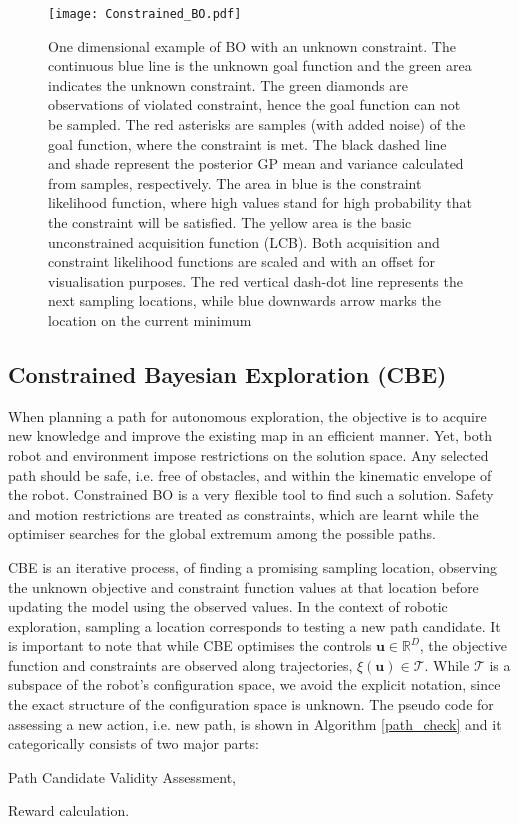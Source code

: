 \documentclass[shortAfour,sageh,times]{sagej_no_sage}
\begin{document}
\begin{figure}[bt]
	
	\centering
	
	\texttt{[image: Constrained\_BO.pdf]}
	
	\caption{One dimensional example of BO with an unknown constraint. The continuous blue line is the unknown goal function and the green area indicates the unknown constraint. The green diamonds are observations of violated constraint, hence the goal function can not be sampled. The red asterisks are samples (with added noise) of the goal function, where the constraint is met. The black dashed line and shade represent the posterior GP mean and variance calculated from samples, respectively. The area in blue is the constraint likelihood function, where high values stand for high probability that the constraint will be satisfied. The yellow area is the basic unconstrained acquisition function (LCB). Both acquisition and constraint likelihood functions are scaled and with an offset for visualisation purposes. The red vertical dash-dot line represents the next sampling locations, while blue downwards arrow marks the location on the current minimum}
	\label{constrained_bo_fig}
\end{figure}
\subsection{Constrained Bayesian Exploration (CBE)}\label{CBO_exploration}
When planning a path for autonomous exploration, the objective is to acquire new knowledge and improve the existing map in an efficient manner. Yet, both robot and environment impose restrictions on the solution space. Any selected path should be safe, i.e. free of obstacles, and within the kinematic envelope of the robot. Constrained BO is a very flexible tool to find such a solution. Safety and motion restrictions are treated as constraints, which are learnt while the optimiser searches for the global extremum among the possible paths.    

CBE is an iterative process, of finding a promising sampling location, observing the unknown objective and constraint function values at that location before updating the model using the observed values. In the context of robotic exploration, sampling a location corresponds to testing a new path candidate. It is important to note that while CBE optimises the controls $\boldsymbol{u} \in \mathbb{R}^D$, the objective function and constraints are observed along trajectories, $\xi(\boldsymbol{u}) \in \mathcal{T}$. While $\mathcal{T}$ is a subspace of the robot's configuration space, we avoid the explicit notation, since the exact structure of the configuration space is unknown. The pseudo code for assessing a new action, i.e. new path, is shown in Algorithm \ref{path_check} and it categorically consists of two major parts:
\begin{inparaenum}[(i)]  
	\item Path Candidate Validity Assessment,
	\item Reward calculation. 
\end{inparaenum}
\end{document}
